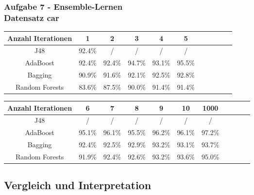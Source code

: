 \documentclass[accentcolor=tud10b,colorbacktitle,inverttitle,landscape,german,presentation,t]{tudbeamer}
\begin{document}
    \begin{frame}[t]
    \frametitle{Aufgabe 7 - Ensemble-Lernen\\ Datensatz car}
        \begin{tabular}{|c||c|c|c|c|c|c|c|c|c|c|}
        \hline 
        Anzahl Iterationen & 1 & 2 & 3 & 4 & 5 \\ 
        \hline 
        J48 & 92.4\% & / & / & / & / \\ 
        \hline 
        AdaBoost & 92.4\% & 92.4\% & 94.7\% & 93.1\% & 95.5\% \\ 
        \hline 
        Bagging & 90.9\% & 91.6\% & 92.1\% & 92.5\% & 92.8\% \\ 
        \hline 
        Random Forests & 83.6\% & 87.5\% & 90.0\% & 91.4\% & 91.4\% \\ 
        \hline 
        \end{tabular}
        
        \begin{tabular}{|c||c|c|c|c|c|c|c|c|c|c|}
        \hline 
        Anzahl Iterationen & 6 & 7 & 8 & 9 & 10 & 1000\\ 
        \hline 
        J48 & / & / & / & / & / & / \\ 
        \hline 
        AdaBoost & 95.1\% & 96.1\% & 95.5\% & 96.2\% & 96.1\% & 97.2\% \\ 
        \hline 
        Bagging & 92.4\% & 92.5\% & 92.9\% & 93.2\% & 93.1\% & 93.7\% \\ 
        \hline 
        Random Forests & 91.9\% & 92.4\% & 92.6\% & 93.2\% & 93.6\% & 95.0\% \\ 
        \hline 
        \end{tabular} 
    \end{frame}
    
    \subsection{Vergleich und Interpretation}
    
\end{document}

